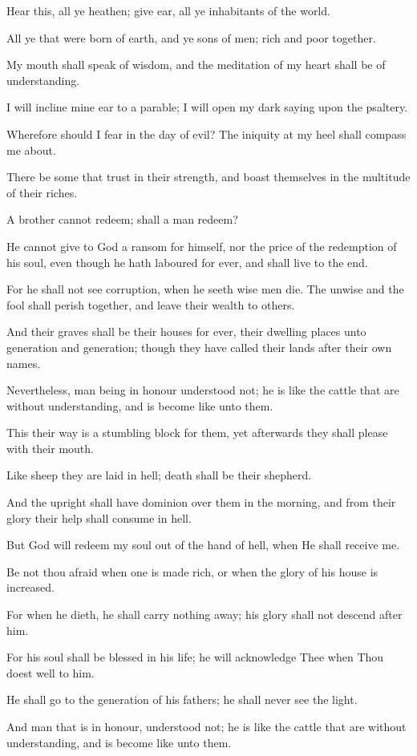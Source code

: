 Hear this, all ye heathen; give ear, all ye inhabitants of the world.

All ye that were born of earth, and ye sons of men; rich and poor together.

My mouth shall speak of wisdom, and the meditation of my heart shall be of understanding.

I will incline mine ear to a parable; I will open my dark saying upon the psaltery.

Wherefore should I fear in the day of evil? The iniquity at my heel shall compass me about.

There be some that trust in their strength, and boast themselves in the multitude of their riches.

A brother cannot redeem; shall a man redeem?

He cannot give to God a ransom for himself, nor the price of the redemption of his soul, even though he hath laboured for ever, and shall live to the end.

For he shall not see corruption, when he seeth wise men die. The unwise and the fool shall perish together, and leave their wealth to others.

And their graves shall be their houses for ever, their dwelling places unto generation and generation; though they have called their lands after their own names.

Nevertheless, man being in honour understood not; he is like the cattle that are without understanding, and is become like unto them.

This their way is a stumbling block for them, yet afterwards they shall please with their mouth.

Like sheep they are laid in hell; death shall be their shepherd.

And the upright shall have dominion over them in the morning, and from their glory their help shall consume in hell.

But God will redeem my soul out of the hand of hell, when He shall receive me.

Be not thou afraid when one is made rich, or when the glory of his house is increased.

For when he dieth, he shall carry nothing away; his glory shall not descend after him.

For his soul shall be blessed in his life; he will acknowledge Thee when Thou doest well to him.

He shall go to the generation of his fathers; he shall never see the light.

And man that is in honour, understood not; he is like the cattle that are without understanding, and is become like unto them.
